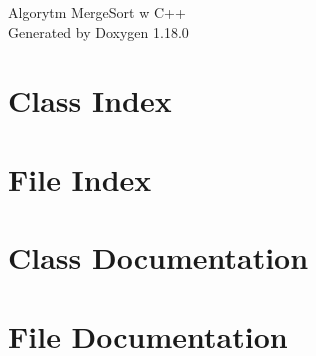 \documentclass[twoside]{book}
\newcommand{\+}{\discretionary{\mbox{\scriptsize$\hookleftarrow$}}{}{}}
\newcommand{\clearemptydoublepage}{%
    \newpage{\pagestyle{empty}\cleardoublepage}%
  }
\begin{document}
  \raggedbottom
    \hypersetup{pageanchor=false,
                bookmarksnumbered=true,
                pdfencoding=unicode
               }
  \begin{titlepage}
  \vspace*{7cm}
  \begin{center}%
  {\Large Algorytm Merge\+Sort w C++}\\
  \vspace*{1cm}
  {\large Generated by Doxygen 1.18.0}\\
  \end{center}
  \end{titlepage}
  \clearemptydoublepage
  \tableofcontents
  \clearemptydoublepage
  \hypersetup{pageanchor=true}

\chapter{Class Index}

\chapter{File Index}

\chapter{Class Documentation}

\chapter{File Documentation}






  \backmatter
  \newpage
  \clearemptydoublepage
  \printindex
\end{document}
